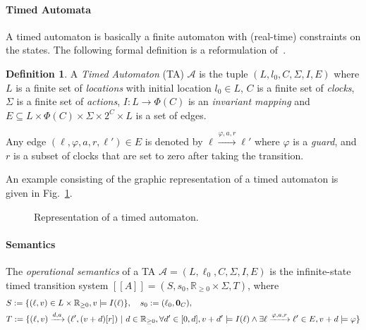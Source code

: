 \documentclass[11pt]{article}
\theoremstyle{definition}
\newtheorem{definition}{Definition}
\theoremstyle{remark}
\theoremstyle{definition}
\begin{document}

\paragraph{Timed Automata}\label{par:ta}
A timed automaton is basically a finite automaton with (real-time) constraints on the states.
The following formal definition is a reformulation of~\cite[Chapter 29.2, Definition 1]{handbook}.
\begin{definition}\label{def:ta}
	A \emph{Timed Automaton} (TA) $\mathcal{A}$ is the tuple $(L, l_0, C, \Sigma, I, E)$ where
	$L$ is a finite set of \emph{locations} with initial location $l_0 \in L$,
	$C$ is a finite set of \emph{clocks},
	$\Sigma$ is a finite set of \emph{actions},
	$I \colon L \to \Phi(C)$ is an \emph{invariant mapping} and
	$E \subseteq L \times \Phi(C) \times \Sigma \times 2^{C} \times L$ is a set of edges.

	Any edge $(\ell, \varphi, a, r, \ell') \in E$ is denoted by $\ell \xrightarrow{\varphi, a, r} \ell'$ where $\varphi$ is a \emph{guard}, and $r$ is a subset of clocks that are set to zero after taking the transition.
\end{definition}
An example consisting of the graphic representation of a timed automaton is given in Fig.~\ref{fig:ta_ex}.

\begin{figure}[ht]
\centering
{}
\caption{Representation of a timed automaton.}\label{fig:ta_ex}
\end{figure}

\paragraph{Semantics}\label{par:semantics}
The \emph{operational semantics} of a TA $\mathcal{A} = (L, \ell_0, C, \Sigma, I, E)$ is the infinite-state timed transition system $[\![A]\!] = (S, s_0, \mathbb{R}_{\geq 0} \times \Sigma, T)$, where
\begin{align*}
	&S := \{(\ell, v) \in L \times \mathbb{R}_{\geq 0}, v \models I(\ell)\}, \quad s_0 := (\ell_0, \text{\bf 0}_C),\\
	&T := \{(\ell, v) \xrightarrow{d, a} (\ell', (v+d)[r]) \ | \ d \in \mathbb{R}_{\geq 0}, \forall d' \in [0, d], v + d' \models I(\ell) \land \exists \ell \xrightarrow{\varphi, a, r} \ell' \in E, v + d \models \varphi \}
\end{align*}
\end{document}
